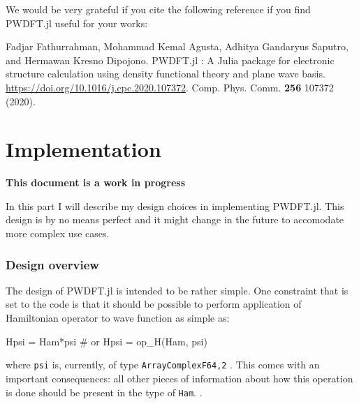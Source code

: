 \documentclass[a4paper,fleqn]{article}
\newcommand{\jlinline}[1]{\texttt{#1}}
\begin{document}
We would be very grateful if you cite the following
reference if you find \textsf{PWDFT.jl} useful for your works:

Fadjar Fathurrahman, Mohammad Kemal Agusta, Adhitya Gandaryus Saputro, and
Hermawan Kresno Dipojono.
PWDFT.jl : A Julia package for electronic structure calculation using density functional 
theory and plane wave basis.
{\footnotesize \url{https://doi.org/10.1016/j.cpc.2020.107372}}.
Comp. Phys. Comm. \textbf{256} 107372 (2020).




\newpage
\part{Implementation}

\textbf{This document is a work in progress}

In this part I will describe my design choices in implementing \textsf{PWDFT.jl}.
This design is by no means perfect
and it might change in the future to accomodate more complex use cases.

\section{Design overview}

The design of \textsf{PWDFT.jl} is intended to be rather simple. One constraint
that is set to the code is that it should be possible to perform application
of Hamiltonian operator to wave function as simple as:
%
\begin{juliacode}
Hpsi = Ham*psi # or
Hpsi = op_H(Ham, psi)
\end{juliacode}
%
where \jlinline{psi} is, currently, of type \jlinline{Array{ComplexF64,2}}
.
%
This comes with an important consequences: all other pieces of information
about how this operation is done should be present in the type of \jlinline{Ham}.
.
\end{document}
